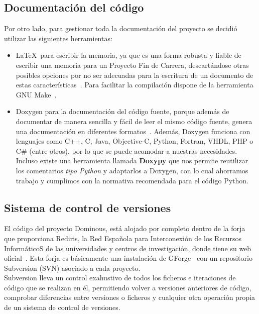 \subsection{Documentación del código}

Por otro lado, para gestionar toda la documentación del proyecto se decidió utilizar las siguientes herramientas:
\begin{itemize}
    \item \LaTeX\ para escribir la memoria, ya que es una forma robusta y fiable de escribir una memoria para
            un Proyecto Fin de Carrera, descartándose otras posibles opciones por no ser adecuadas para la escritura
            de un documento de estas características~\cite{mitt04}. Para facilitar la compilación dispone de la herramienta
            GNU Make~\cite{pdf:make}.
    \item Doxygen para la documentación del código fuente, porque además de documentar de manera sencilla y fácil
            de leer el mismo código fuente, genera una documentación en diferentes formatos~\cite{website:doxygen}. Además,
            Doxygen funciona con lenguajes como C++, C, Java, Objective-C, Python, Fortran, VHDL, PHP o C\#
            (entre otros), por lo que se puede acomodar a nuestras necesidades. Incluso existe una
            herramienta llamada \textbf{Doxypy} que nos permite reutilizar los comentarios \emph{tipo Python}
            y adaptarlos a Doxygen, con lo cual ahorramos trabajo y cumplimos con la normativa recomendada para el código Python.
\end{itemize}

\subsection{Sistema de control de versiones}

El código del proyecto Dominous, está alojado por completo dentro de
la forja que proporciona Rediris, la Red Española para Interconexión
de los Recursos InformáticoS de las universidades y centros de
investigación, donde tiene su web
oficial~\cite{website:dominous}. Esta forja es básicamente una
instalación de GForge~\cite{website:gforge} con un repositorio
Subversion (SVN) asociado a cada proyecto. \\

Subversion lleva un control exahustivo de todos los ficheros e iteraciones de código que se realizan en él,
permitiendo volver a versiones anteriores de código, comprobar diferencias entre versiones o ficheros y cualquier otra
operación propia de un sistema de control de versiones. \\

